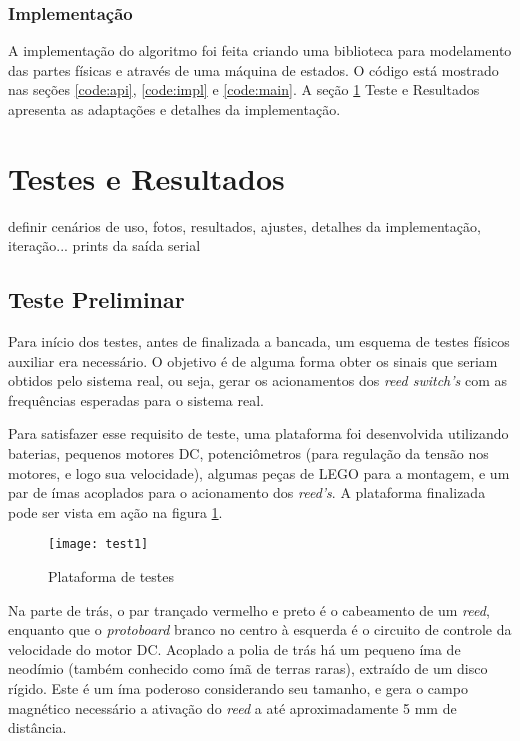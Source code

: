 \documentclass[a4paper,11pt]{article}
\begin{document}
\subsubsection{Implementação}
\label{sec:implemt}

A implementação do algoritmo foi feita criando uma biblioteca para
modelamento das partes físicas e através de uma máquina de  estados. O código
está mostrado nas seções \ref{code:api}, \ref{code:impl} e \ref{code:main}. A
seção \ref{sec:resultados} Teste e Resultados apresenta as adaptações e
detalhes da implementação.


\pagebreak
%
\section{Testes e Resultados}
\label{sec:resultados}
definir cenários de uso, fotos, resultados, ajustes,
detalhes da implementação, iteração... prints da saída serial

\subsection{Teste Preliminar}

Para início dos testes, antes de finalizada a bancada, um esquema de testes
físicos auxiliar era necessário. O objetivo é de alguma forma obter os sinais
que seriam obtidos pelo sistema real, ou seja, gerar os acionamentos dos
\textit{reed switch's} com as frequências esperadas para o sistema real.

Para satisfazer esse requisito de teste, uma plataforma foi desenvolvida
utilizando baterias, pequenos motores DC, potenciômetros (para regulação da
tensão nos motores, e logo sua velocidade), algumas peças de
LEGO\textsuperscript{\textregistered} para a montagem, e um par de ímas
acoplados para o acionamento dos \textit{reed's}. A plataforma finalizada pode
ser vista em ação na figura \ref{fig:test1}.

\begin{figure}[h!]
\begin{center}
 \texttt{[image: test1]}
\end{center}
  \caption{Plataforma de testes}
  \label{fig:test1}
\end{figure}

Na parte de trás, o par trançado vermelho e preto é o cabeamento de um
\textit{reed}, enquanto que o \textit{protoboard} branco no centro à esquerda é
o circuito de controle da velocidade do motor DC. Acoplado a polia de trás há
um pequeno íma de neodímio (também conhecido como ímã de terras raras),
extraído de um disco rígido. Este é um íma poderoso considerando seu tamanho, e
gera o campo magnético necessário a ativação do \textit{reed} a até
aproximadamente 5 mm de distância.
\end{document}
